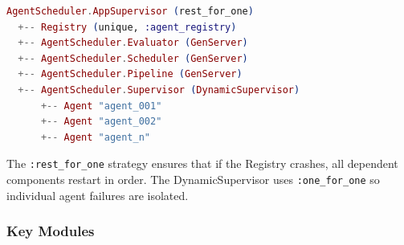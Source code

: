 \documentclass[12pt,a4paper]{article}
\theoremstyle{definition}
\begin{document}
\begin{lstlisting}[language=elixir, caption={Agent Scheduler supervision tree}]
AgentScheduler.AppSupervisor (rest_for_one)
  +-- Registry (unique, :agent_registry)
  +-- AgentScheduler.Evaluator (GenServer)
  +-- AgentScheduler.Scheduler (GenServer)
  +-- AgentScheduler.Pipeline (GenServer)
  +-- AgentScheduler.Supervisor (DynamicSupervisor)
      +-- Agent "agent_001"
      +-- Agent "agent_002"
      +-- Agent "agent_n"
\end{lstlisting}

The \texttt{:rest\_for\_one} strategy ensures that if the Registry crashes,
all dependent components restart in order.
The DynamicSupervisor uses \texttt{:one\_for\_one} so individual agent failures
are isolated.

\subsubsection{Key Modules}
\end{document}

